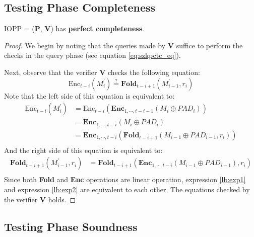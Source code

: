 \subsection{Testing Phase Completeness}

\begin{lemma}
\label{lemma:szkpctcc}

IOPP = ($\textbf{P}$, $\textbf{V}$) has \textbf{perfect completeness}.

\end{lemma}
\begin{proof}
We begin by noting that the queries made by $\textbf{V}$ suffice to perform the checks in the query phase (see equation \ref{eq:szkpctc_eq}).

Next, observe that the verifier $\textbf{V}$ checks the following equation:
$$
    \text{Enc}_{t-i}(M_i^\prime) \stackrel{?}{=} 
    \textbf{Fold}_{t-i+1}(M_{i-1}^\prime, r_i) 
$$
Note that the left side of this equation is equivalent to:
\begin{align}
\text{Enc}_{t-i}(M_i^\prime) \nonumber
&= \text{Enc}_{t-i}(\textbf{Enc}_{1, \cdots, t- i - 1}(M_i \oplus PAD_i)) \nonumber \\
&= \textbf{Enc}_{1, \cdots, t-i}(M_i \oplus PAD_i) \nonumber \\
&= \textbf{Enc}_{1, \cdots, t-i}(\textbf{Fold}_{t-i+1}(M_{i-1} \oplus PAD_{i-1}, r_i)) \label{lb:exp1} \\
\end{align}
And the right side of this equation is equivalent to:
\begin{align}
\textbf{Fold}_{t-i+1}(M_{i-1}^\prime, r_i) 
&= \textbf{Fold}_{t-i+1}(\textbf{Enc}_{1, \cdots, t- i}(M_{i-1} \oplus PAD_{i-1}), r_i) \label{lb:exp2} \\
\end{align}
Since both \textbf{Fold} and \textbf{Enc} operations are linear operation, expression \ref{lb:exp1} and  expression \ref{lb:exp2} are equivalent to each other.
The equations checked by the verifier $\textbf{V}$ holds.

\end{proof}




\subsection{Testing Phase Soundness}

